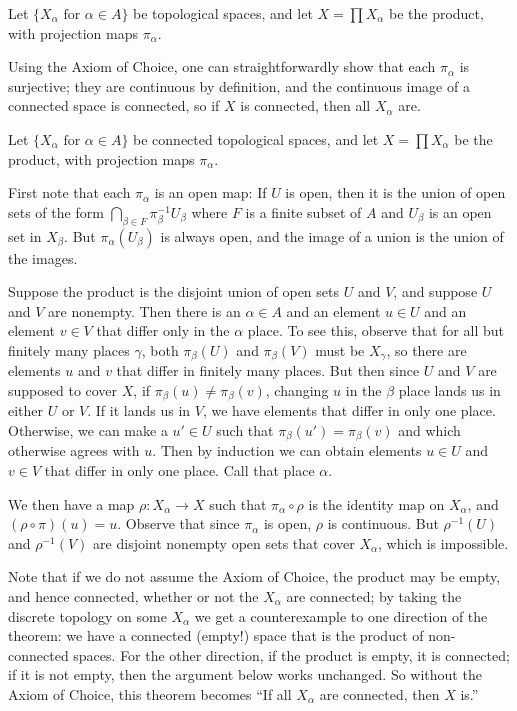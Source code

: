 \documentclass[12pt]{article}
\begin{document}

Let $\{X_\alpha\text{ for }\alpha\in A\}$ be topological spaces, and let $X=\prod X_\alpha$ be the product, with projection maps $\pi_\alpha$.  

Using the Axiom of Choice, one can straightforwardly show that each $\pi_\alpha$ is surjective; they are continuous by definition, and the continuous image of a connected space is connected, so if $X$ is connected, then all $X_\alpha$ are.

Let $\{X_\alpha\text{ for }\alpha\in A\}$ be connected topological spaces, and let $X=\prod X_\alpha$ be the product, with projection maps $\pi_\alpha$. 

First note that each $\pi_\alpha$ is an open map: If $U$ is open, then it is the union of open sets of the form $\bigcap_{\beta\in F} \pi_\beta^{-1} U_\beta$ where $F$ is a finite subset of $A$ and $U_\beta$ is an open set in $X_\beta$. But $\pi_\alpha(U_\beta)$ is always open, and the image of a union is the union of the images.

Suppose the product is the disjoint union of open sets $U$ and $V$, and suppose $U$ and $V$ are nonempty. Then there is an $\alpha\in A$ and an element $u\in U$ and an element $v\in V$ that differ only in the $\alpha$ place.  To see this, observe that for all but finitely many places $\gamma$, both $\pi_\beta(U)$ and $\pi_\beta(V)$ must be $X_\gamma$, so there are elements $u$ and $v$ that differ in finitely many places. But then since $U$ and $V$ are supposed to cover $X$, if $\pi_\beta(u)\neq\pi_\beta(v)$, changing $u$ in the $\beta$ place lands us in either $U$ or $V$. If it lands us in $V$, we have elements that differ in only one place. Otherwise, we can make a $u'\in U$ such that $\pi_\beta(u')=\pi_\beta(v)$ and which otherwise agrees with $u$.  Then by induction we can obtain elements $u\in U$ and $v\in V$ that differ in only one place. Call that place $\alpha$.

We then have a map $\rho:X_\alpha\to X$ such that $\pi_\alpha \circ \rho$ is the identity map on $X_\alpha$, and $(\rho\circ\pi)(u)=u$. Observe that since $\pi_\alpha$ is open, $\rho$ is continuous.  But $\rho^{-1}(U)$ and $\rho^{-1}(V)$ are disjoint nonempty open sets that cover $X_\alpha$, which is impossible.

Note that if we do not assume the Axiom of Choice, the product may be empty, and hence connected, whether or not the $X_\alpha$ are connected; by taking the discrete topology on some $X_\alpha$ we get a counterexample to one direction of the theorem: we have a connected (empty!) space that is the product of non-connected spaces.
For the other direction, if the product is empty, it is connected; if it is not empty, then the argument below works unchanged.
So without the Axiom of Choice, this theorem becomes ``If all $X_\alpha$ are connected, then $X$ is.''  

\end{document}
